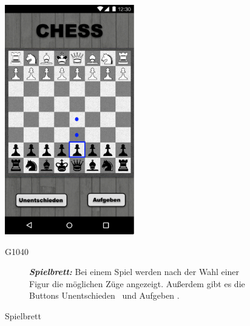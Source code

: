 \documentclass[parskip=full]{scrartcl}
\begin{document}
\begin{figure}[htp]
		\begin{minipage}[t]{6cm}
			\vspace{0pt}
			\includegraphics[height=100mm]{ingame.png}
			\caption{Spielbrett}
			\label{fig:Spielbrett}
		\end{minipage}
		\hfill
		\begin{minipage}[t]{6cm}
			\vspace{0pt}
			\begin{description}
				\item[G1040] \textbf{\textit{Spielbrett: }} Bei einem Spiel werden nach der Wahl einer Figur die möglichen Züge angezeigt. Außerdem gibt es die Buttons \glqq Unentschieden \grqq\ und \glqq Aufgeben \grqq.
			\end{description}
		\end{minipage}
	\end{figure}
	
\end{document}
